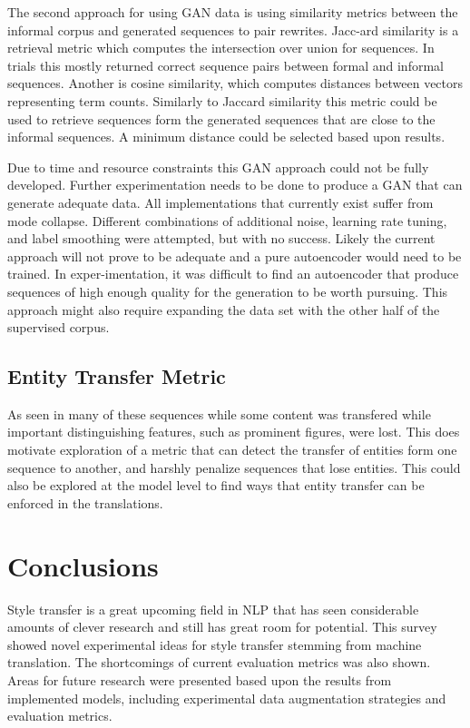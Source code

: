 \documentclass[12pt]{article}
\begin{document}
The second approach for using GAN data is using similarity metrics between
the informal corpus and generated sequences to pair rewrites. Jacc-ard similarity is
a retrieval metric which
computes the intersection over union for sequences. In trials this mostly returned 
correct sequence pairs between formal and informal sequences. 
Another is cosine similarity, which computes distances between vectors representing
term counts. Similarly to Jaccard similarity this metric could be used to retrieve 
sequences form the generated sequences that are close to the informal sequences. A minimum
distance could be selected based upon results. \par

Due to time and resource constraints this GAN approach could not be fully developed.
Further experimentation needs to be done to produce a GAN that can generate 
adequate data. All implementations that currently exist suffer from mode collapse. 
Different combinations of additional noise, learning rate tuning, and label smoothing 
were attempted, but with no success.
Likely the current approach will not prove to be adequate and a pure autoencoder
would need to be trained. In exper-imentation, it was difficult to find an autoencoder
that produce sequences of high enough quality for the generation to be worth 
pursuing. This approach might also require expanding the data set with the other half
of the supervised corpus. 

\subsection{Entity Transfer Metric}
As seen in many of these sequences while some content was transfered while important 
distinguishing features, such as prominent figures, were lost. This does motivate exploration
of a metric that can detect the transfer of entities form one sequence to another, and harshly
penalize sequences that lose entities. This could also be explored at the model level
to find ways that entity transfer can be enforced in the translations. 

\section{Conclusions}
Style transfer is a great upcoming field in NLP that has seen 
considerable amounts of clever research and still has great room for potential.
This survey showed novel experimental ideas for style transfer stemming from machine 
translation. The shortcomings of current evaluation metrics was also shown. Areas for 
future research were presented based upon the results from implemented models, including 
experimental data augmentation strategies and evaluation metrics. 

\pagebreak

\end{document}
